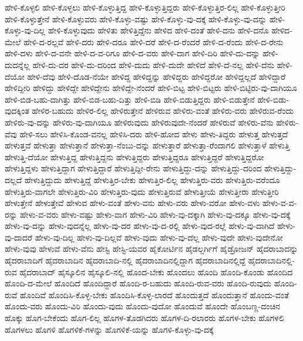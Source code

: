 {ಹೇಳಿ-ಕೊಳ್ಳಲಿ
ಹೇಳಿ-ಕೊಳ್ಳಲು
ಹೇಳಿ-ಕೊಳ್ಳುತ್ತಿದ್ದ
ಹೇಳಿ-ಕೊಳ್ಳುತ್ತಿದ್ದರು
ಹೇಳಿ-ಕೊಳ್ಳುತ್ತಿರ-ಲಿಲ್ಲ
ಹೇಳಿ-ಕೊಳ್ಳುತ್ತೀರಿ
ಹೇಳಿ-ಕೊಳ್ಳುತ್ತೇನೆ
ಹೇಳಿ-ಕೊಳ್ಳುವರು
ಹೇಳಿ-ಕೊಳ್ಳು-ವಷ್ಟು
ಹೇಳಿ-ಕೊಳ್ಳು-ವು-ದಕ್ಕೆ
ಹೇಳಿ-ಕೊಳ್ಳು-ವು-ದನ್ನು
ಹೇಳಿ-ಕೊಳ್ಳು-ವು-ದಿಲ್ಲ
ಹೇಳಿ-ಕೊಳ್ಳುವುದು
ಹೇಳಿತು
ಹೇಳಿತ್ತಿದ್ದೆನು
ಹೇಳಿದ
ಹೇಳಿ-ದಂತೆ
ಹೇಳಿ-ದನು
ಹೇಳಿ-ದನೊ
ಹೇಳಿದ-ಮೇಲೆ
ಹೇಳಿ-ದ-ರಲ್ಲವೆ
ಹೇಳಿ-ದರು
ಹೇಳಿ-ದರೂ
ಹೇಳಿ-ದರೆ
ಹೇಳಿ-ದ-ರೆಂದರೆ
ಹೇಳಿ-ದ-ರೆಂದು
ಹೇಳಿ-ದ-ರೇನು
ಹೇಳಿ-ದಳು
ಹೇಳಿ-ದ-ವನೇ
ಹೇಳಿ-ದ-ವ-ರಿಗೂ
ಹೇಳಿ-ದ-ವರು
ಹೇಳಿ-ದಾಗ
ಹೇಳಿ-ದಿರಿ
ಹೇಳಿ-ದು-ದನ್ನು
ಹೇಳಿ-ದುದನ್ನೆಲ್ಲ
ಹೇಳಿ-ದು-ದರ
ಹೇಳಿ-ದು-ದರಿಂದ
ಹೇಳಿ-ದುದು
ಹೇಳಿ-ದುದೇ
ಹೇಳಿದೆ
ಹೇಳಿ-ದೆ-ನಲ್ಲ
ಹೇಳಿ-ದೆನು
ಹೇಳಿ-ದೆಯೋ
ಹೇಳಿ-ದೆವು
ಹೇಳಿ-ದೊಡ-ನೆಯೇ
ಹೇಳಿದ್ದ
ಹೇಳಿದ್ದನ್ನು
ಹೇಳಿದ್ದರು
ಹೇಳಿದ್ದರೋ
ಹೇಳಿದ್ದಲ್ಲದೆ
ಹೇಳಿದ್ದಾರೆ
ಹೇಳಿದ್ದೀರಿ
ಹೇಳಿದ್ದು
ಹೇಳಿದ್ದೇ
ಹೇಳಿದ್ದೇನು
ಹೇಳಿದ್ದೇ-ನೆಂದರೆ
ಹೇಳಿ-ಬಿಟ್ಟ
ಹೇಳಿ-ಬಿಟ್ಟರು
ಹೇಳಿ-ಬಿಟ್ಟಿರು-ವು-ದಾಗಿಯೂ
ಹೇಳಿ-ಬಿಡ-ಬಹು-ದಾಗಿತ್ತು
ಹೇಳಿ-ಬಿಡ-ಬಹು-ದಿತ್ತು
ಹೇಳಿ-ಬಿಡಿ
ಹೇಳಿ-ಬಿಡುತ್ತಿದ್ದರು
ಹೇಳಿ-ಬಿಡುತ್ತೇನೆ
ಹೇಳಿ-ಬಿಡು-ವುದಕ್ಕಿಂತ
ಹೇಳಿರ-ಬಹುದು
ಹೇಳಿರ-ಲಿಲ್ಲ
ಹೇಳಿರುತ್ತೇನೆ
ಹೇಳಿರುವ
ಹೇಳಿರು-ವಂತೆ
ಹೇಳಿರು-ವರು
ಹೇಳಿರುವ-ರೆಂದು
ಹೇಳಿರು-ವು-ದನ್ನು
ಹೇಳಿರು-ವು-ದಾಗಿಯೂ
ಹೇಳಿರುವುದು
ಹೇಳಿರುವುದೇ-ನೆಂದರೆ
ಹೇಳಿರುವೆ
ಹೇಳಿರು-ವೆನು
ಹೇಳಿರು-ವೆವು
ಹೇಳಿ-ಸಲು
ಹೇಳಿಸಿ-ಕೊಂಡ-ವನಲ್ಲ
ಹೇಳಿಸಿ-ದರು
ಹೇಳಿ-ಹೋದ
ಹೇಳು
ಹೇಳು-ತಿದ್ದರು
ಹೇಳುತ್ತ
ಹೇಳುತ್ತದೆ
ಹೇಳುತ್ತವೆ
ಹೇಳುತ್ತಾ
ಹೇಳುತ್ತಾನೆ
ಹೇಳುತ್ತಾ-ನೆಂಬು-ದನ್ನು
ಹೇಳುತ್ತಾರೆ
ಹೇಳುತ್ತಾ-ರೆಂದಾಗಲಿ
ಹೇಳುತ್ತಾಳೆ
ಹೇಳುತ್ತಿ
ಹೇಳುತ್ತಿ-ದೆಯೋ
ಹೇಳುತ್ತಿದ್ದ
ಹೇಳುತ್ತಿದ್ದನು
ಹೇಳುತ್ತಿದ್ದರು
ಹೇಳುತ್ತಿದ್ದರೂ
ಹೇಳುತ್ತಿದ್ದರೆ
ಹೇಳುತ್ತಿದ್ದರೋ
ಹೇಳುತ್ತಿದ್ದಳು
ಹೇಳುತ್ತಿದ್ದಾಗ
ಹೇಳುತ್ತಿದ್ದಾರೆ
ಹೇಳುತ್ತಿದ್ದೀ-ರೇನು
ಹೇಳುತ್ತಿದ್ದು-ದನ್ನು
ಹೇಳುತ್ತಿದ್ದು-ದರಿಂದ
ಹೇಳುತ್ತಿದ್ದು-ದಲ್ಲದೆ
ಹೇಳುತ್ತಿದ್ದುದು
ಹೇಳುತ್ತಿದ್ದೆ
ಹೇಳುತ್ತಿರ-ಬೇಕು
ಹೇಳುತ್ತಿರ-ಲಿಲ್ಲ
ಹೇಳುತ್ತಿರು-ವರು
ಹೇಳುತ್ತಿರು-ವರೆಂದೂ
ಹೇಳುತ್ತಿರು-ವಾಗಲೇ
ಹೇಳುತ್ತಿರು-ವಿರಿ
ಹೇಳುತ್ತಿರು-ವುದು
ಹೇಳುತ್ತಿರುವೆ
ಹೇಳುತ್ತೀಯೆ
ಹೇಳುತ್ತೀರಾ
ಹೇಳುತ್ತೀರಿ
ಹೇಳುತ್ತೇನೆ
ಹೇಳುತ್ತೇವೆ
ಹೇಳುವ
ಹೇಳು-ವಂತೆ
ಹೇಳು-ವನು
ಹೇಳು-ವರು
ಹೇಳು-ವರೋ
ಹೇಳು-ವಳು
ಹೇಳು-ವ-ವ-ರನ್ನು
ಹೇಳು-ವ-ವರು
ಹೇಳು-ವಷ್ಟು
ಹೇಳು-ವಾಗ
ಹೇಳು-ವಿರಿ
ಹೇಳು-ವು-ದಕ್ಕಾಗಿ
ಹೇಳು-ವು-ದಕ್ಕೂ
ಹೇಳು-ವು-ದಕ್ಕೆ
ಹೇಳು-ವು-ದನ್ನು
ಹೇಳು-ವುದನ್ನೆಲ್ಲ
ಹೇಳು-ವು-ದರ
ಹೇಳು-ವು-ದ-ರಲ್ಲಿ
ಹೇಳು-ವುದ-ರಲ್ಲೆ
ಹೇಳು-ವು-ದಾಗಿದೆ
ಹೇಳು-ವು-ದಾದರೆ
ಹೇಳು-ವು-ದಿಲ್ಲ
ಹೇಳು-ವು-ದಿಲ್ಲವೆ
ಹೇಳು-ವುದು
ಹೇಳು-ವು-ದೆಲ್ಲ
ಹೇಳು-ವುದೇ
ಹೇಳು-ವುದೇನೋ
ಹೇಳು-ವುವು
ಹೇಳುವೆ
ಹೇಳು-ವೆನು
ಹೇಸ್ಟಿ
ಹೇಸ್ಟಿ-ಯವರ
ಹೈಕೋರ್ಟಿನ
ಹೈಡಲ್ಬರ್ಗಿಗೆ
ಹೈಡ್ರೋಜನ್
ಹೈದರಾಬಾದನ್ನು
ಹೈದರಾಬಾದಿಗೆ
ಹೈದರಾಬಾದಿನ
ಹೈದರಾಬಾದಿ-ನಲ್ಲಿ
ಹೈದರಾಬಾದಿನಲ್ಲಿದ್ದಾಗ
ಹೈದರಾಬಾದಿನಲ್ಲಿದ್ದೆ
ಹೈದರಾಬಾದಿನಲ್ಲಿ-ರುವ
ಹೈದರಾಬಾದ್
ಹೈಸ್ಕೂಲಿನ
ಹೈಸ್ಕೂಲಿ-ನಲ್ಲಿ
ಹೊಂದ-ಬೇಕು
ಹೊಂದಲು
ಹೊಂದಿ
ಹೊಂದಿ-ಕೊಂಡು
ಹೊಂದಿದ
ಹೊಂದಿ-ದ-ಮೇಲೆ
ಹೊಂದಿದೆ
ಹೊಂದಿದ್ದಾರೆ
ಹೊಂದಿ-ರ-ಬಹುದು
ಹೊಂದಿ-ರುವ-ವರು
ಹೊಂದಿ-ರುವುದು
ಹೊಂದಿ-ರುವೆ
ಹೊಂದಿವೆ
ಹೊಂದಿಸಿ-ಕೊಳ್ಳ-ಬೇಕು
ಹೊಂದಿಸಿ-ಕೊಳ್ಳ-ಲಾರದೆ
ಹೊಂದುತ್ತದೆ
ಹೊಂದುತ್ತಾನೆ
ಹೊಂದು-ವಂತೆ
ಹೊಂದು-ವರು
ಹೊಂದು-ವಿರಿ
ಹೊಂದು-ವುದು
ಹೊಂದು-ವುದೋ
ಹೊಂದುವೆ
ಹೊಂದೇ
ಹೊಂಬಣ್ಣ-ದಂಚಿನ
ಹೊಕ್ಕು
ಹೊಗ-ಬೇಕೆಂದು
ಹೊಗ-ಲಿಲ್ಲ
ಹೊಗಳ-ತೊಡಗಿದರು
ಹೊಗಳ-ದಿ-ರಲಾರರು
ಹೊಗಳ-ಬೇಕು
ಹೊಗಳಲಿ
ಹೊಗಳಲು
ಹೊಗಳಿ
ಹೊಗಳಿಕೆ-ಗಳನ್ನು
ಹೊಗಳಿಕೆ-ಯನ್ನು
ಹೊಗಳಿ-ಕೊಳ್ಳು-ವು-ದಕ್ಕೆ
}
